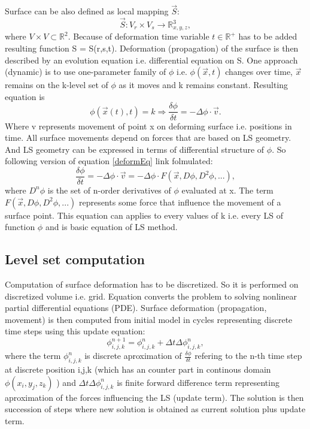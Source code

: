 Surface can be also defined as local mapping $\vec{S}$:
\begin{equation}
\vec{S}: V_r \times V_s \rightarrow \mathbb R^3_{x,y,z},
\end{equation}
where $V \times V \subset \mathbb R^2$. Because of deformation time variable $t
\in \mathbb R^+$ has to be added resulting function S = S(r,s,t).
Deformation (propagation) of the surface is then described by an evolution
equation i.e. differential equation on S. One approach (dynamic) is to use
one-parameter family of $\phi$ i.e. $\phi(\vec{x},t)$ changes over time,
$\vec{x}$ remains on the k-level set of $\phi$ as it moves and k remains
constant. Resulting equation is
\begin{equation}
\label{deformEq}
\phi(\vec{x}(t),t) = k \Rightarrow \frac{\delta \phi}{\delta t} = - \Delta \phi
\cdot \vec{v}.
\end{equation}
Where v represents movement of point x on deforming surface i.e. positions in time.
All surface movements depend on forces that are based on LS geometry. And LS geometry can be expressed in terms of differential structure of $\phi$. So following version of equation \ref{deformEq} link folmulated:
\begin{equation}
\frac{\delta\phi}{\delta t} = - \Delta \phi \cdot \vec{v} = - \Delta \phi
\cdot F(\vec{x}, D\phi, D^2\phi, ...),
\end{equation}
where $D^n\phi$ is the set of n-order derivatives of $\phi$ evaluated at x. The term $F(\vec{x}, D\phi, D^2\phi, ...)$ represents some force that influence the movement of a surface point. This equation can applies to every values of k i.e. every LS of function $\phi$ and is basic equation of LS method.

\subsection{Level set computation}

Computation of surface deformation has to be discretized. So it is performed on discretized volume i.e. grid. Equation converts the problem to solving nonlinear partial differential equations (PDE). Surface deformation (propagation, movement) is then computed from initial model in cycles representing discrete time steps using this update equation:
\begin{equation}
\label{deformEqApprox}
\phi_{i,j,k}^{n+1} = \phi_{i,j,k}^{n} + \Delta t \Delta \phi_{i,j,k}^{n},
\end{equation}
where the term $\phi_{i,j,k}^{n}$ is discrete aproximation of $\frac{\delta\phi}{\delta t}$ refering to the n-th time step at discrete position i,j,k (which has an counter part in continous domain $\phi(x_i, y_j, z_k)$ ) and $\Delta t \Delta \phi_{i,j,k}^{n}$ is finite forward difference term representing aproximation of the forces influencing the LS (update term). The solution is then succession of steps where new solution is obtained as current solution plus update term.

